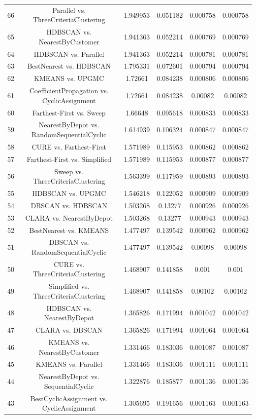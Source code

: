 \documentclass[a4paper,10pt]{article}
\begin{document}
\begin{landscape}
\begin{table}[!htp]
\begin{tabular}{cccccc}
66&Parallel vs. ThreeCriteriaClustering&1.949953&0.051182&0.000758&0.000758\\
65&HDBSCAN vs. NearestByCustomer&1.941363&0.052214&0.000769&0.000769\\
64&HDBSCAN vs. Parallel&1.941363&0.052214&0.000781&0.000781\\
63&BestNearest vs. HDBSCAN&1.795331&0.072601&0.000794&0.000794\\
62&KMEANS vs. UPGMC&1.72661&0.084238&0.000806&0.000806\\
61&CoefficientPropagation vs. CyclicAssignment&1.72661&0.084238&0.00082&0.00082\\
60&Farthest-First vs. Sweep&1.66648&0.095618&0.000833&0.000833\\
59&NearestByDepot vs. RandomSequentialCyclic&1.614939&0.106324&0.000847&0.000847\\
58&CURE vs. Farthest-First&1.571989&0.115953&0.000862&0.000862\\
57&Farthest-First vs. Simplified&1.571989&0.115953&0.000877&0.000877\\
56&Sweep vs. ThreeCriteriaClustering&1.563399&0.117959&0.000893&0.000893\\
55&HDBSCAN vs. UPGMC&1.546218&0.122052&0.000909&0.000909\\
54&DBSCAN vs. HDBSCAN&1.503268&0.13277&0.000926&0.000926\\
53&CLARA vs. NearestByDepot&1.503268&0.13277&0.000943&0.000943\\
52&BestNearest vs. KMEANS&1.477497&0.139542&0.000962&0.000962\\
51&DBSCAN vs. RandomSequentialCyclic&1.477497&0.139542&0.00098&0.00098\\
50&CURE vs. ThreeCriteriaClustering&1.468907&0.141858&0.001&0.001\\
49&Simplified vs. ThreeCriteriaClustering&1.468907&0.141858&0.00102&0.00102\\
48&HDBSCAN vs. NearestByDepot&1.365826&0.171994&0.001042&0.001042\\
47&CLARA vs. DBSCAN&1.365826&0.171994&0.001064&0.001064\\
46&KMEANS vs. NearestByCustomer&1.331466&0.183036&0.001087&0.001087\\
45&KMEANS vs. Parallel&1.331466&0.183036&0.001111&0.001111\\
44&NearestByDepot vs. SequentialCyclic&1.322876&0.185877&0.001136&0.001136\\
43&BestCyclicAssignment vs. CyclicAssignment&1.305695&0.191656&0.001163&0.001163\\

\end{tabular}
\end{table}
\end{landscape}
\end{document}
